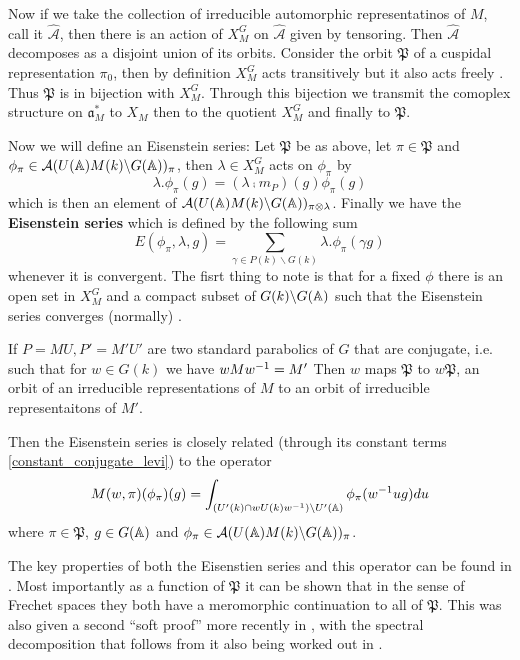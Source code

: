 Now if we take the collection of irreducible automorphic representatinos of \(M\), call it \(\hat{\mathcal{A}}\), then there is an action of \(X_M^G\) on \(\hat{\mathcal{A}}\) given by tensoring. Then \(\hat{\mathcal{A}}\) decomposes as a disjoint union of its orbits. Consider the orbit \(\mathfrak{P}\) of a cuspidal representation \(\pi_0\), then by definition \(X_M^G\) acts transitively but it also acts freely \cite[II.1]{moeglinSpectralDecompositionEisenstein1995}. Thus \(\mathfrak{P}\) is in bijection with \(X_M^G\). Through this bijection we transmit the comoplex structure on \(\mathfrak{a}_M^*\) to \(X_M\) then to the quotient \(X_M^G\) and finally to \(\mathfrak{P}\).

Now we will define an Eisenstein series: Let \(\mathfrak{P}\) be as above, let \(\pi\in \mathfrak{P}\) and \(\phi_\pi \in \mathcal{A}(U(\A)M(k)\backslash G(\A))_\pi\), then \(\lambda\in X_M^G\) acts on \(\phi_\pi\) by 
\[\lambda.\phi_\pi(g) = (\lambda \comp m_P)(g) \phi_\pi(g)\]
which is then an element of \(\mathcal{A}(U(\A)M(k)\backslash G(\A))_{\pi\tensor \lambda}\). Finally we have the \textbf{Eisenstein series} which is defined by the following sum
\[E(\phi_\pi, \lambda, g) = \sum_{\gamma \in P(k)\backslash G(k)} \lambda.\phi_\pi(\gamma g)\]
whenever it is convergent. The fisrt thing to note is that for a fixed \(\phi\) there is an open set in \(X_M^G\) and a compact subset of \(G(k)\backslash G(\A)\) such that the Eisenstein series converges (normally) \cite[II.1.5]{moeglinSpectralDecompositionEisenstein1995}.

If \(P = MU, P' = M'U'\) are two standard parabolics of \(G\) that are conjugate, i.e. such that for \(w\in G(k)\) we have \(wMw^{-1} = M'\)
Then \(w\) maps \(\mathfrak{P}\) to \(w\mathfrak{P}\), an orbit of an irreducible representations of \(M\) to an orbit of irreducible representaitons of \(M'\).

Then the Eisenstein series is closely related (through its constant terms \ref{constant_conjugate_levi}) to the operator
\[M(w, \pi)(\phi_\pi)(g) = \int_{(U'(k)\cap wU(k)w\inv )\backslash U'(\A)} \phi_\pi(w\inv ug) du\]
where \(\pi\in \mathfrak{P}\), \(g\in G(\A)\) and \(\phi_\pi \in \mathcal{A}(U(\A)M(k)\backslash G(\A))_\pi\).

The key properties of both the Eisenstien series and this operator can be found in \cite[IV.1.8, IV.1.9, IV.1.10, IV.1.11]{moeglinSpectralDecompositionEisenstein1995}. Most importantly as a function of \(\mathfrak{P}\) it can be shown that in the sense of Frechet spaces they both have a meromorphic continuation to all of \(\mathfrak{P}\). This was also given a second ``soft proof'' more recently in \cite{bernsteinMeromorphicContinuationEisenstein2022}, with the spectral decomposition that follows from it also being worked out in \cite{delormeSpectralTheoremLanglands2021}.

